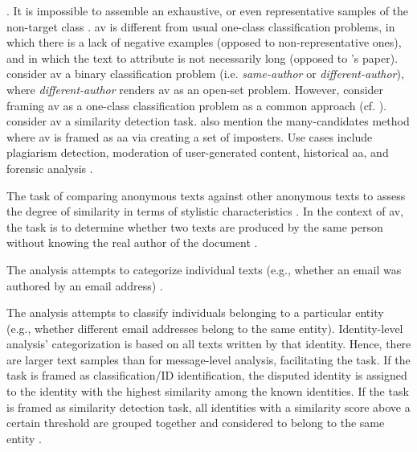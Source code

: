 \begin{definition}
    \cite{llm_detection_av_2025,neal_surveying_2018,koppel_authorship_2004}.
    It is impossible to assemble an exhaustive, or even representative samples of the non-target class \cite{koppel_authorship_2004}.
    \ac{av} is different from usual one-class classification problems, in which there is a lack of negative examples (opposed to non-representative ones), 
    and in which the text to attribute is not necessarily long (opposed to \citet{koppel_authorship_2004}'s paper).
    \citet{neal_surveying_2018} consider \ac{av} a binary classification problem (i.e. \textit{same-author} or \textit{different-author}), 
    where \textit{different-author} renders \ac{av} as an open-set problem.
    However, \citet{neal_surveying_2018} consider framing \ac{av} as a one-class classification problem as a common approach (cf. \cite{llm_detection_av_2025}).
    \citet{elmanarelbouanani_authorship_2014} consider \ac{av} a similarity detection task.
    \citet{neal_surveying_2018} also mention the many-candidates method where \ac{av} is framed as \ac{aa} via creating a set of imposters.
    Use cases include plagiarism detection, moderation of user-generated content, historical \ac{aa}, and forensic analysis \cite{rivera_soto_learning_2021}.
\end{definition}

\begin{definition}
    The task of comparing anonymous texts against other anonymous texts to assess the degree of similarity in terms of stylistic characteristics \cite{abbasi_writeprints_2008,neal_surveying_2018}.
    In the context of \ac{av}, the task is to determine whether two texts are produced by the same person without knowing the real author of the document \cite{elmanarelbouanani_authorship_2014}.
\end{definition}

\begin{definition}
    The analysis attempts to categorize individual texts (e.g., whether an email was authored by an email address) \cite{abbasi_writeprints_2008}.
\end{definition}

\begin{definition}
    The analysis attempts to classify individuals belonging to a particular entity 
    (e.g., whether different email addresses belong to the same entity).
    Identity-level analysis' categorization is based on all texts written by that identity.
    Hence, there are larger text samples than for message-level analysis, facilitating the task.
    If the task is framed as classification/ID identification, the disputed identity is assigned to the identity with the highest similarity among the known identities.
    If the task is framed as similarity detection task, all identities with a similarity score above a certain threshold are grouped together and 
    considered to belong to the same entity \cite{abbasi_writeprints_2008}.
\end{definition}

